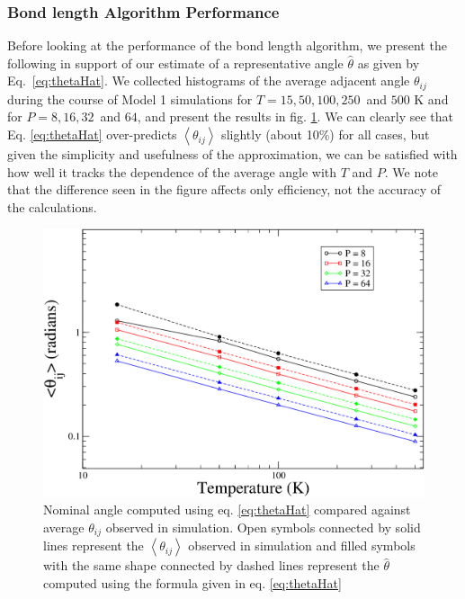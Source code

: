             \subsubsection{Bond length Algorithm Performance}
                \label{sec:blPerformance}
                Before looking at the performance of the bond length algorithm, we present the following in support of our estimate of a representative angle $\hat \theta$ as given by Eq.~\eqref{eq:thetaHat}. We collected histograms of the average adjacent angle $\theta_{ij}$ during the course of Model 1 simulations for $T = 15, 50, 100, 250$~and $500$ K and for $P = 8, 16, 32$~and $64$, and present the results in fig. \ref{fig:nominal_angle}. We can clearly see that Eq. \eqref{eq:thetaHat} over-predicts $\left<\theta_{ij}\right>$ slightly (about 10\%) for all cases, but given the simplicity and usefulness of the approximation, we can be satisfied with how well it tracks the dependence of the average angle with $T$ and $P$. We note that the difference seen in the figure affects only efficiency, not the accuracy of the calculations.
                \begin{figure}[!htbp]
                    \centering
                    \includegraphics[scale=0.20,keepaspectratio]{Chapter-4/Figures/nominalAnglelogXlogY.png}
                    \caption{Nominal angle computed using eq. \eqref{eq:thetaHat} compared against average $\theta_{ij}$ observed in simulation. Open symbols connected by solid lines represent the $\left<\theta_{ij}\right>$ observed in simulation and filled symbols with the same shape connected by dashed lines represent the $\hat \theta$ computed using the formula given in eq. \eqref{eq:thetaHat}}
                    \label{fig:nominal_angle}
                \end{figure}

